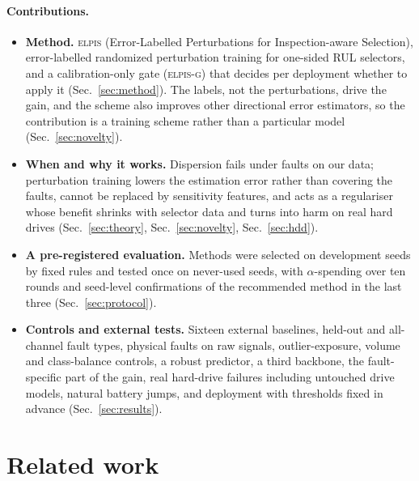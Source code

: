 \documentclass{esannV2}
\newcommand{\RPT}{\textsc{elpis}}
\newcommand{\AUTOD}{\textsc{elpis-g}}
\begin{document}
\paragraph{Contributions.}
\begin{itemize}
\item \textbf{Method.} \RPT{} (Error-Labelled Perturbations for Inspection-aware Selection), error-labelled randomized perturbation training for one-sided RUL selectors, and a calibration-only gate (\AUTOD) that decides per deployment whether to apply it (Sec.~\ref{sec:method}). The labels, not the perturbations, drive the gain, and the scheme also improves other directional error estimators, so the contribution is a training scheme rather than a particular model (Sec.~\ref{sec:novelty}).
\item \textbf{When and why it works.} Dispersion fails under faults on our data; perturbation training lowers the estimation error rather than covering the faults, cannot be replaced by sensitivity features, and acts as a regulariser whose benefit shrinks with selector data and turns into harm on real hard drives (Sec.~\ref{sec:theory}, Sec.~\ref{sec:novelty}, Sec.~\ref{sec:hdd}).
\item \textbf{A pre-registered evaluation.} Methods were selected on development seeds by fixed rules and tested once on never-used seeds, with $\alpha$-spending over ten rounds and seed-level confirmations of the recommended method in the last three (Sec.~\ref{sec:protocol}).
\item \textbf{Controls and external tests.} Sixteen external baselines, held-out and all-channel fault types, physical faults on raw signals, outlier-exposure, volume and class-balance controls, a robust predictor, a third backbone, the fault-specific part of the gain, real hard-drive failures including untouched drive models, natural battery jumps, and deployment with thresholds fixed in advance (Sec.~\ref{sec:results}).
\end{itemize}

\FloatBarrier
\section{Related work}\label{sec:related}
\end{document}
